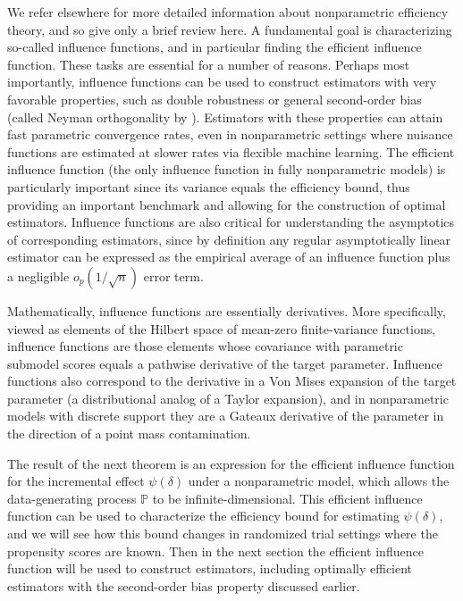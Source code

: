 \documentclass[12pt]{article}
\newcommand{\Pb}{\mathbb{P}}
\theoremstyle{remark}
\begin{document}
We refer elsewhere \autocite{bickel1993efficient, van2002semiparametric, van2003unified, tsiatis2006semiparametric, kennedy2016semiparametric} for more detailed information about nonparametric efficiency theory, and so give only a brief review here. A fundamental goal is characterizing so-called influence functions, and in particular finding the efficient influence function. These tasks are essential for a number of reasons. Perhaps most importantly, influence functions can be used to construct estimators with very favorable properties, such as double robustness or general second-order bias (called Neyman orthogonality by \textcite{chernozhukov2016double}). Estimators with these properties can attain fast parametric convergence rates, even in nonparametric settings where nuisance functions are estimated at slower rates via flexible machine learning. The efficient influence function (the only influence function in fully nonparametric models) is particularly important since its variance equals the efficiency bound, thus providing an important benchmark and allowing for the construction of optimal estimators. Influence functions are also critical for understanding the asymptotics of corresponding estimators, since by definition any regular asymptotically linear estimator can be expressed as the empirical average of an influence function plus a negligible $o_p(1/\sqrt{n})$ error term.

Mathematically, influence functions are essentially derivatives. More specifically, viewed as elements of the Hilbert space of mean-zero finite-variance functions, influence functions are those elements whose covariance with parametric submodel scores equals a pathwise derivative of the target parameter. Influence functions also correspond to the derivative in a Von Mises expansion of the target parameter (a distributional analog of a Taylor expansion), and in nonparametric models with discrete support they are a Gateaux derivative of the parameter in the direction of a point mass contamination. 

The result of the next theorem is an expression for the efficient influence function for the incremental effect $\psi(\delta)$ under a nonparametric model, which allows the data-generating process $\Pb$ to be infinite-dimensional. This efficient influence function can be used to characterize the efficiency bound for estimating $\psi(\delta)$, and we will see how this bound changes in randomized trial settings where the propensity scores are known. Then in the next section the efficient influence function will be used to construct estimators, including optimally efficient estimators with the second-order bias property discussed earlier.
\end{document}
